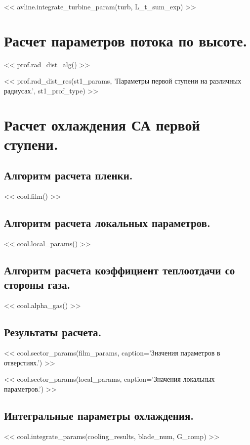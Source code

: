 \documentclass[a4paper,10pt]{article}
\begin{document}
    << avline.integrate_turbine_param(turb, L_t_sum_exp) >>

    \section{Расчет параметров потока по высоте.}

    << prof.rad_dist_alg() >>

    << prof.rad_dist_res(st1_params, 'Параметры первой ступени на различных радиусах.', st1_prof_type) >>

    \section{Расчет охлаждения СА первой ступени.}

    \subsection{Алгоритм расчета пленки.}

    << cool.film() >>

    \subsection{Алгоритм расчета локальных параметров.}

    << cool.local_params() >>

    \subsection{Алгоритм расчета коэффициент теплоотдачи со стороны газа.}

    << cool.alpha_gas() >>

    \subsection{Результаты расчета.}

    << cool.sector_params(film_params, caption='Значения параметров в отверстиях.') >>

    << cool.sector_params(local_params, caption='Значения локальных параметров.') >>

    \subsection{Интегральные параметры охлаждения.}

    << cool.integrate_params(cooling_results, blade_num, G_comp) >>
\end{document}
